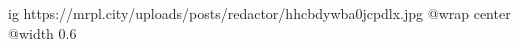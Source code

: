  
 
 
 
 

\ifcmt
  ig https://mrpl.city/uploads/posts/redactor/hhcbdywba0jcpdlx.jpg
  @wrap center
  @width 0.6
\fi
